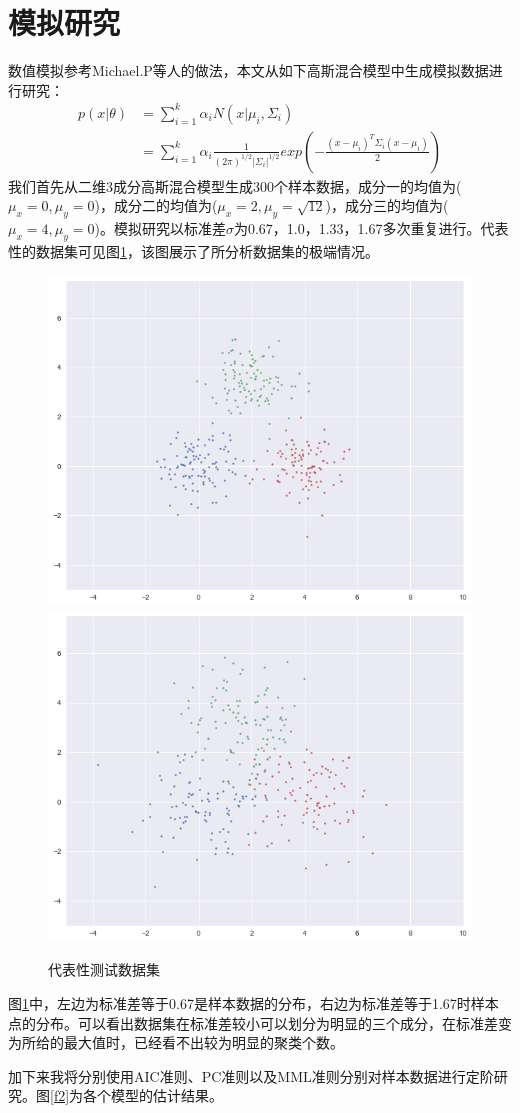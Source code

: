 \documentclass[a4paper,12pt,openany,oneside,utf-8]{ctexbook}
\begin{document}
	
	\section{模拟研究}
	数值模拟参考Michael.P等人的做法，本文从如下高斯混合模型中生成模拟数据进行研究：
	\begin{equation}\label{eq40}
	\begin{aligned}
	p(x|\theta )&=\sum_{i=1}^{k}\alpha_iN(x|\mu_i,\Sigma_i)\\&=\sum_{i=1}^{k}\alpha_i\frac{1}{(2\pi)^{1/2}|\Sigma_i|^{1/2}}exp(-\frac{(x-\mu_i)^T\Sigma_i(x-\mu_i)}{2})
	\end{aligned}
	\end{equation}
	我们首先从二维3成分高斯混合模型生成300个样本数据，成分一的均值为($\mu_x=0,\mu_y=0$)，成分二的均值为($\mu_x=2,\mu_y=\sqrt{12}$)，成分三的均值为($\mu_x=4,\mu_y=0$)。模拟研究以标准差$\sigma$为0.67，1.0，1.33，1.67多次重复进行。代表性的数据集可见图\ref{f1}，该图展示了所分析数据集的极端情况。
	
	\begin{figure}[H]\centering
		\includegraphics[width=.32\textwidth]{figure/1.1.png}
		\includegraphics[width=.32\textwidth]{figure/1.2.png}
		\caption{代表性测试数据集}\label{f1}
	\end{figure}
	图\ref{f1}中，左边为标准差等于0.67是样本数据的分布，右边为标准差等于1.67时样本点的分布。可以看出数据集在标准差较小可以划分为明显的三个成分，在标准差变为所给的最大值时，已经看不出较为明显的聚类个数。
	
	加下来我将分别使用AIC准则、PC准则以及MML准则分别对样本数据进行定阶研究。图\ref{f2}为各个模型的估计结果。
	
\end{document}
